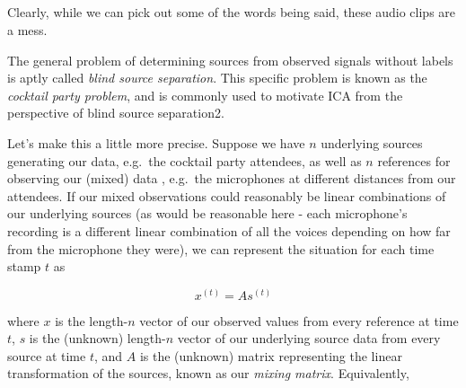 \documentclass[11pt]{article}
\begin{document}
    
    \begin{center}
    \end{center}
    { \hspace*{\fill} \\}
    
    \begin{center}
    \end{center}
    { \hspace*{\fill} \\}
    
    \begin{center}
    \end{center}
    { \hspace*{\fill} \\}
    
    \begin{center}
    \end{center}
    { \hspace*{\fill} \\}
    
    Clearly, while we can pick out some of the words being said, these audio
clips are a mess.

    The general problem of determining sources from observed signals without
labels is aptly called \emph{blind source separation}. This specific
problem is known as the \emph{cocktail party problem}, and is commonly
used to motivate ICA from the perspective of blind source separation2.

    Let's make this a little more precise. Suppose we have \(n\) underlying
sources generating our data, e.g.~the cocktail party attendees, as well
as \(n\) references for observing our (mixed) data , e.g.~the
microphones at different distances from our attendees. If our mixed
observations could reasonably be linear combinations of our underlying
sources (as would be reasonable here - each microphone's recording is a
different linear combination of all the voices depending on how far from
the microphone they were), we can represent the situation for each time
stamp \(t\) as

\[
x^{(t)} = As^{(t)}
\]

where \(x\) is the length-\(n\) vector of our observed values from every
reference at time \(t\), \(s\) is the (unknown) length-\(n\) vector of
our underlying source data from every source at time \(t\), and \(A\) is
the (unknown) matrix representing the linear transformation of the
sources, known as our \emph{mixing matrix}. Equivalently,
\end{document}

